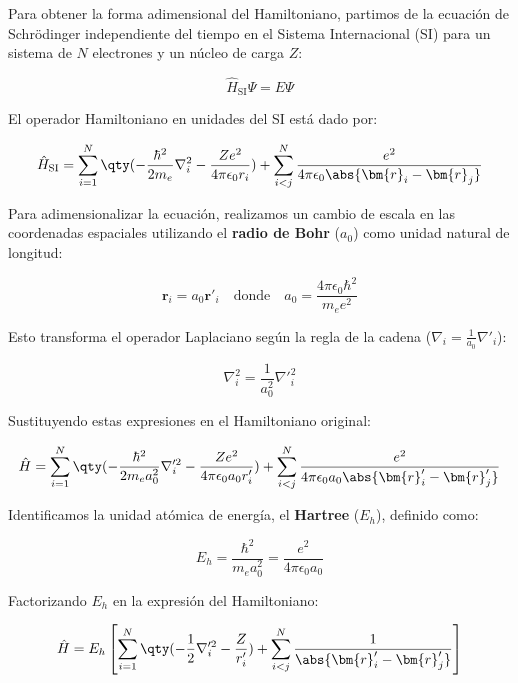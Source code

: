 Para obtener la forma adimensional del Hamiltoniano, partimos de la ecuación de Schrödinger independiente del tiempo en el Sistema Internacional (SI) para un sistema de $N$ electrones y un núcleo de carga $Z$:

\begin{equation}
    \hat{H}_{\text{SI}} \Psi = E \Psi
\end{equation}

El operador Hamiltoniano en unidades del SI está dado por:

\begin{equation}
    \hat{H}_{\text{SI}} = \sum_{i=1}^N \qty( -\frac{\hbar^2}{2m_e} \nabla_i^2 - \frac{Ze^2}{4\pi\epsilon_0 r_i} ) + \sum_{i<j}^N \frac{e^2}{4\pi\epsilon_0 \abs{\bm{r}_i - \bm{r}_j}}
\end{equation}

Para adimensionalizar la ecuación, realizamos un cambio de escala en las coordenadas espaciales utilizando el \textbf{radio de Bohr} ($a_0$) como unidad natural de longitud:

\begin{equation}
    \bm{r}_i = a_0 \bm{r}'_i \quad \text{donde} \quad a_0 = \frac{4\pi\epsilon_0 \hbar^2}{m_e e^2}
\end{equation}

Esto transforma el operador Laplaciano según la regla de la cadena ($\nabla_i = \frac{1}{a_0}\nabla'_i$):

\begin{equation}
    \nabla_i^2 = \frac{1}{a_0^2} \nabla'^2_i
\end{equation}

Sustituyendo estas expresiones en el Hamiltoniano original:

\begin{equation}
    \hat{H} = \sum_{i=1}^N \qty( -\frac{\hbar^2}{2m_e a_0^2} \nabla'^2_i - \frac{Ze^2}{4\pi\epsilon_0 a_0 r'_i} ) + \sum_{i<j}^N \frac{e^2}{4\pi\epsilon_0 a_0 \abs{\bm{r}'_i - \bm{r}'_j}}
\end{equation}

Identificamos la unidad atómica de energía, el \textbf{Hartree} ($E_h$), definido como:

\begin{equation}
    E_h = \frac{\hbar^2}{m_e a_0^2} = \frac{e^2}{4\pi\epsilon_0 a_0}
\end{equation}

Factorizando $E_h$ en la expresión del Hamiltoniano:

\begin{equation}
    \hat{H} = E_h \left[ \sum_{i=1}^N \qty( -\frac{1}{2} \nabla'^2_i - \frac{Z}{r'_i} ) + \sum_{i<j}^N \frac{1}{\abs{\bm{r}'_i - \bm{r}'_j}} \right]
\end{equation}

